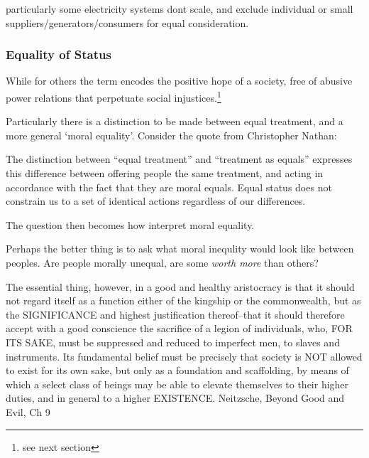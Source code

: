 particularly some electricity systems dont scale, and exclude individual or small suppliers/generators/consumers for equal consideration.






\subsubsection{Equality of Status}



While for others the term encodes the positive hope of a society, free of abusive power relations that perpetuate social injustices.\footnote{see next section}








Particularly there is a distinction to be made between equal treatment, and a more general `moral equality'.
Consider the quote from Christopher Nathan:

\begin{displayquote}
The distinction between ``equal treatment'' and ``treatment as equals'' expresses this difference between offering people the same treatment, and acting in accordance with the fact that they are moral equals. Equal status does not constrain us to a set of identical actions regardless of our differences.\cite{whatisbasicequalitynathan}
\end{displayquote}

The question then becomes how interpret moral equality.

Perhaps the better thing is to ask what moral inequlity would look like between peoples.
Are people morally unequal, are some \textit{worth more} than others?

\begin{displayquote}
The essential thing, however, in a good and healthy aristocracy is that it should not regard itself as a function either of the kingship or the commonwealth, but as the SIGNIFICANCE and highest justification thereof--that it should therefore accept with a good conscience the sacrifice of a legion of individuals, who, FOR ITS SAKE, must be suppressed and reduced to imperfect men, to slaves and instruments. Its fundamental belief must be precisely that society is NOT allowed to exist for its own sake, but only as a foundation and scaffolding, by means of which a select class of beings may be able to elevate themselves to their higher duties, and in general to a higher EXISTENCE.
\cite{NietzscheGutenberg} Neitzsche, Beyond Good and Evil, Ch 9
\end{displayquote}


